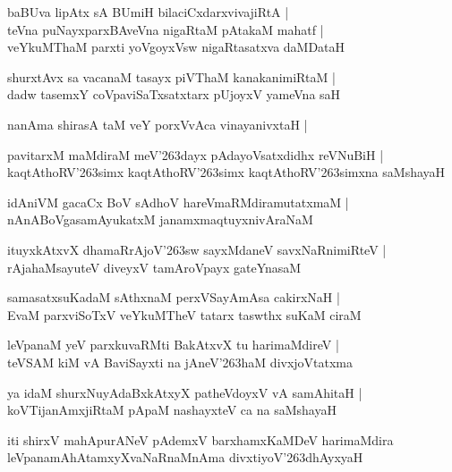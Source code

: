 \begin{shloka}
baBUva lipAtx sA BUmiH bilaciCxdarxvivajiRtA |\\
teVna puNayxparxBAveVna nigaRtaM pAtakaM mahatf |\\
veYkuMThaM parxti yoVgoyxVsw nigaRtasatxva daMDataH
\end{shloka}

\begin{shloka}
shurxtAvx sa vacanaM tasayx piVThaM kanakanimiRtaM |\\
dadw tasemxY coVpaviSaTxsatxtarx pUjoyxV yameVna saH
\end{shloka}
nanAma shirasA taM veY porxVvAca vinayanivxtaH |

\begin{shloka}
pavitarxM maMdiraM meV\char'263dayx pAdayoVsatxdidhx reVNuBiH |\\
kaqtAthoRV\char'263simx kaqtAthoRV\char'263simx kaqtAthoRV\char'263simxna saMshayaH 
\end{shloka}

\begin{shloka}
idAniVM gacaCx BoV sAdhoV hareVmaRMdiramutatxmaM |\\
nAnABoVgasamAyukatxM janamxmaqtuyxnivAraNaM
\end{shloka}

\begin{shloka}
ituyxkAtxvX dhamaRrAjoV\char'263sw sayxMdaneV savxNaRnimiRteV |\\
rAjahaMsayuteV diveyxV tamAroVpayx gateYnasaM
\end{shloka}

\begin{shloka}
samasatxsuKadaM sAthxnaM perxVSayAmAsa cakirxNaH |\\
EvaM parxviSoTxV veYkuMTheV tatarx taswthx suKaM ciraM
\end{shloka}

\begin{shloka}
leVpanaM yeV parxkuvaRMti BakAtxvX tu harimaMdireV |\\
teVSAM kiM vA BaviSayxti na jAneV\char'263haM divxjoVtatxma
\end{shloka}

\begin{shloka}
ya idaM shurxNuyAdaBxkAtxyX patheVdoyxV vA samAhitaH |\\
koVTijanAmxjiRtaM pApaM nashayxteV ca na saMshayaH
\end{shloka}
iti shirxV mahApurANeV pAdemxV barxhamxKaMDeV harimaMdira leVpanamAhAtamxyXvaNaRnaMnAma divxtiyoV\char'263dhAyxyaH

